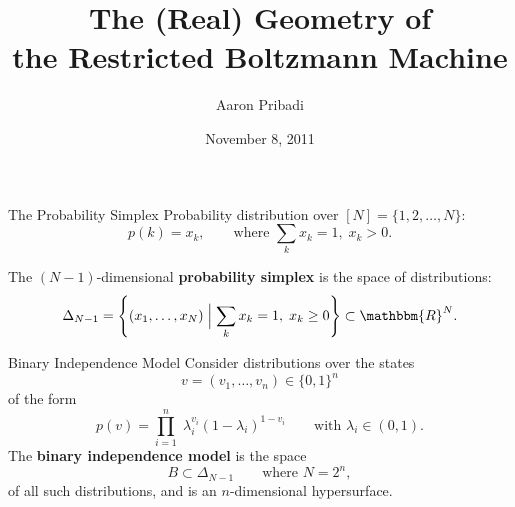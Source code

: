 \documentclass[mathserif,xcolor=dvipsnames]{beamer}
\title[The Geometry of DBNs]{The (Real) Geometry of \\the Restricted Boltzmann Machine}
\author{Aaron Pribadi}
\institute[HMC]{Harvey Mudd College}
\date{November 8, 2011}
\renewcommand*{\R}{\mathbbm{R}}
\begin{document}
\begin{frame}[plain]
    \maketitle
\end{frame}


\begin{frame}{The Probability Simplex}
    Probability distribution over $[N] = \{1,2,\ldots, N\}$:
    \[
        p(k) = x_k,
        \qquad
        \text{where }
        \sum_k x_k = 1,
        \;
        x_k > 0.
    \]

    The $(N-1)$-dimensional \textbf{probability simplex} is the space of
    distributions:
    \[
        \Delta_{N-1} = \cdil*{(x_1, \ldots, x_N) 
        \;\Bigl\vert\;
        \sum_k x_k = 1,\; x_k \ge 0}
        \subset
        \R^N.
    \]
\end{frame}

\begin{frame}
    \linespace
    \linespace
    \begin{center}
    \end{center}
\end{frame}

\begin{frame}{Binary Independence Model}
    Consider distributions over the states
    \[
        v = (v_1, \ldots, v_n) \in \{0,1\}^n
    \]
    of the form
    \[
        p(v) = \prod_{i=1}^n\; \lambda_i^{v_i} (1 - \lambda_i)^{1-v_i}
        \qquad
        \text{with }\lambda_i \in (0,1).
    \]
    The \textbf{binary independence model} is the space 
    \[
        B \subset \Delta_{N-1}
        \qquad\text{where $N = 2^n$},
    \]
    of all such distributions, and is an $n$-dimensional hypersurface.
\end{frame}
\end{document}
